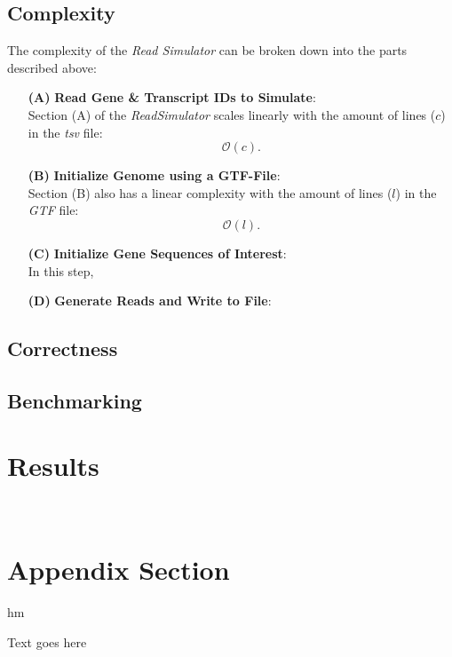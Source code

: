 \documentclass[12pt]{article}
\begin{document}
\subsection{Complexity}
The complexity of the \textit{Read Simulator} can be broken down into the parts described above:
\begin{enumerate}
	\item[\textbf{(A)}] \textbf{Read Gene \& Transcript IDs to Simulate}:\\
        Section (A) of the \textit{ReadSimulator} scales linearly with the amount of lines ($c$) in the \textit{tsv} file:
        \[
            \mathcal{O}(c)
        .\]
	\item[\textbf{(B)}] \textbf{Initialize Genome using a GTF-File}:\\
        Section (B) also has a linear complexity with the amount of lines ($l$) in the \textit{GTF} file:
        \[
            \mathcal{O}(l)
        .\]
	\item[\textbf{(C)}] \textbf{Initialize Gene Sequences of Interest}:\\
        In this step, 
    \item[\textbf{(D)}] \textbf{Generate Reads and Write to File}:\\
\end{enumerate}
\subsection{Correctness}
\subsection{Benchmarking}

\section{Results}





\newpage~\appendix

\section{Appendix Section}

hm

Text goes here
\end{document}
